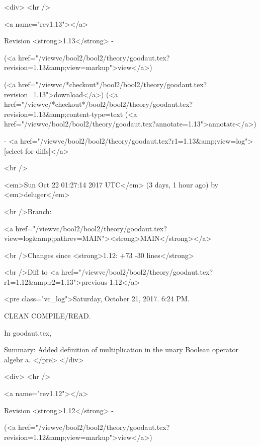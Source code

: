 <div>
<hr />

<a name="rev1.13"></a>


Revision <strong>1.13</strong> -


(<a href="/viewvc/bool2/bool2/theory/goodaut.tex?revision=1.13&amp;view=markup">view</a>)


(<a href="/viewvc/*checkout*/bool2/bool2/theory/goodaut.tex?revision=1.13">download</a>)
(<a href="/viewvc/*checkout*/bool2/bool2/theory/goodaut.tex?revision=1.13&amp;content-type=text%
(<a href="/viewvc/bool2/bool2/theory/goodaut.tex?annotate=1.13">annotate</a>)



- <a href="/viewvc/bool2/bool2/theory/goodaut.tex?r1=1.13&amp;view=log">[select for diffs]</a>




<br />

<em>Sun Oct 22 01:27:14 2017 UTC</em>
(3 days, 1 hour ago)
by <em>deluger</em>


<br />Branch:

<a href="/viewvc/bool2/bool2/theory/goodaut.tex?view=log&amp;pathrev=MAIN"><strong>MAIN</strong></a>







<br />Changes since <strong>1.12: +73 -30 lines</strong>








<br />Diff to <a href="/viewvc/bool2/bool2/theory/goodaut.tex?r1=1.12&amp;r2=1.13">previous 1.12</a>










<pre class="vc_log">Saturday, October 21, 2017.  6:24 PM.

CLEAN COMPILE/READ.

In goodaut.tex,

Summary: Added definition of multiplication in the unary Boolean operator algebr
a.
</pre>
</div>



<div>
<hr />

<a name="rev1.12"></a>


Revision <strong>1.12</strong> -


(<a href="/viewvc/bool2/bool2/theory/goodaut.tex?revision=1.12&amp;view=markup">view</a>)


